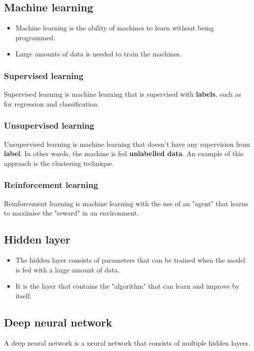 \documentclass[11pt]{article}
\begin{document}
\subsection{Machine learning}
\label{sec:orgd19b696}
\begin{itemize}
\item Machine learning is the ability of machines to learn without being programmed.
\item Large amounts of data is needed to train the machines.
\end{itemize}

\subsubsection{Supervised learning}
\label{sec:org666ca86}
Supervised learning is machine learning that is supervised with \textbf{labels}, such as for regression and classification.

\subsubsection{Unsupervised learning}
\label{sec:orgee33140}
Unsupervised learning is machine learning that doesn't have any supervision from \textbf{label}. In other words, the machine is fed \textbf{unlabelled data}. An example of this approach is the clustering technique.

\subsubsection{Reinforcement learning}
\label{sec:org8962d1c}
Reinforcement learning is machine learning with the use of an "agent" that learns to maximise the "reward" in an environment.

\subsection{Hidden layer}
\label{sec:orgb65a3a0}
\begin{itemize}
\item The hidden layer consists of parameters that can be trained when the model is fed with a large amount of data.
\item It is the layer that contains the "algorithm" that can learn and improve by itself.
\end{itemize}

\subsection{Deep neural network}
\label{sec:org1ad4596}
A deep neural network is a neural network that consists of multiple hidden layers.
\end{document}
